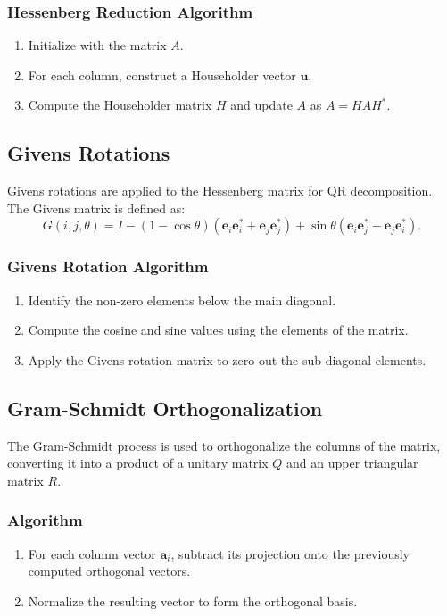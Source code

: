 \documentclass[12pt]{article}
\begin{document}
\subsubsection{Hessenberg Reduction Algorithm}
\begin{enumerate}
    \item Initialize with the matrix $A$.
    \item For each column, construct a Householder vector $\mathbf{u}$.
    \item Compute the Householder matrix $H$ and update $A$ as $A = HAH^*$.
\end{enumerate}

\subsection{Givens Rotations}
Givens rotations are applied to the Hessenberg matrix for QR decomposition. The Givens matrix is defined as:
\[
G(i, j, \theta) = I - (1 - \cos\theta)(\mathbf{e}_i \mathbf{e}_i^* + \mathbf{e}_j \mathbf{e}_j^*) + \sin\theta(\mathbf{e}_i \mathbf{e}_j^* - \mathbf{e}_j \mathbf{e}_i^*).
\]

\subsubsection{Givens Rotation Algorithm}
\begin{enumerate}
    \item Identify the non-zero elements below the main diagonal.
    \item Compute the cosine and sine values using the elements of the matrix.
    \item Apply the Givens rotation matrix to zero out the sub-diagonal elements.
\end{enumerate}

\subsection{Gram-Schmidt Orthogonalization}
The Gram-Schmidt process is used to orthogonalize the columns of the matrix, converting it into a product of a unitary matrix $Q$ and an upper triangular matrix $R$.

\subsubsection{Algorithm}
\begin{enumerate}
    \item For each column vector $\mathbf{a}_i$, subtract its projection onto the previously computed orthogonal vectors.
    \item Normalize the resulting vector to form the orthogonal basis.
\end{enumerate}
\end{document}
